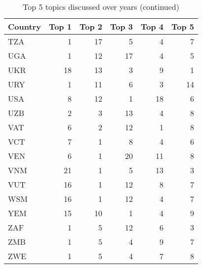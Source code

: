     
    
    \begin{table}
    \centering
    \caption{Top 5 topics discussed over years (continued)}
    \label{tab:top 5 topics all6}
    \begin{tabular}{lrrrrr}
    \toprule
    Country &     Top 1 &     Top 2 &     Top 3 &     Top 4 &     Top 5 \\
    \midrule
    TZA  & 1 & 17 & 5 & 4 & 7\\
    UGA  & 1 & 12 & 17 & 4 & 5\\
    UKR  & 18 & 13 & 3 & 9 & 1\\
    URY  & 1 & 11 & 6 & 3 & 14\\
    USA  & 8 & 12 & 1 & 18 & 6\\
    UZB  & 2 & 3 & 13 & 4 & 8\\
    VAT  & 6 & 2 & 12 & 1 & 8\\
    VCT  & 7 & 1 & 8 & 4 & 6\\
    VEN  & 6 & 1 & 20 & 11 & 8\\
    VNM  & 21 & 1 & 5 & 13 & 3\\
    VUT  & 16 & 1 & 12 & 8 & 7\\
    WSM  & 16 & 1 & 12 & 4 & 7\\
    YEM  & 15 & 10 & 1 & 4 & 9\\
    ZAF  & 1 & 5 & 12 & 6 & 3\\
    ZMB  & 1 & 5 & 4 & 9 & 7\\
    ZWE  & 1 & 5 & 4 & 7 & 8\\
    \bottomrule
    \end{tabular}\end{table}